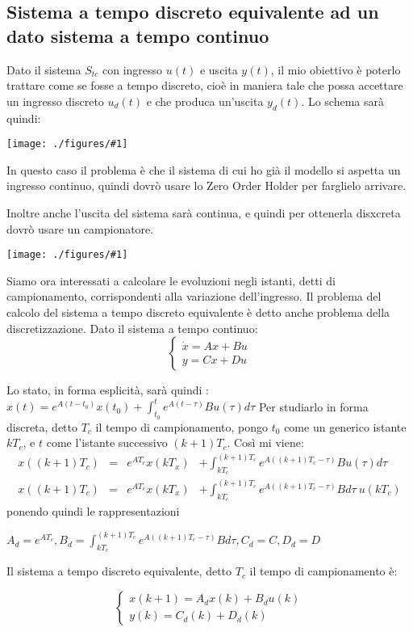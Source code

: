 \documentclass{article}
\newcommand{\incfig}[2]{%
	\texttt{[image: ./figures/\#1]}%
}
\begin{document}
\subsection{Sistema a tempo discreto equivalente ad un dato sistema a tempo continuo}
Dato il sistema $S_{tc}$ con ingresso $u(t)$ e uscita $y(t)$, il mio obiettivo è poterlo trattare come se fosse a tempo discreto, cioè in maniera tale
che possa accettare un ingresso discreto $u_d(t)$ e che produca un'uscita $y_d(t)$.
Lo schema sarà quindi:

\incfig{ZOH.jpeg}{0.4}

In questo caso il problema è che il sistema di cui ho già il modello si aspetta un ingresso continuo, quindi dovrò usare lo Zero Order Holder per
farglielo arrivare.

Inoltre anche l'uscita del sistema sarà continua, e quindi per ottenerla disxcreta dovrò usare un campionatore.

\incfig{discreto.jpeg}{0.4}

Siamo ora interessati a calcolare le evoluzioni negli istanti, detti di campionamento, corrispondenti alla variazione dell'ingresso.
Il problema del calcolo del sistema a tempo discreto equivalente è detto anche problema della discretizzazione. Dato il sistema a tempo continuo:
\[
\begin{cases}
    \dot{x} = Ax+Bu\\
    y = Cx+Du
\end{cases}
\]

Lo stato, in forma esplicità, sarà quindi : \(\displaystyle x(t) = e^{A(t-t_0)}x(t_0) + \int_{t_0}^{t} e^{A(t-\tau)}Bu(\tau)d\tau\)
Per studiarlo in forma discreta, detto $T_c$ il tempo di campionamento, pongo $t_0$ come un generico istante $kT_c$, e $t$ come l'istante successivo
$(k+1)T_c$. Così mi viene:
\begin{align*} 
    x((k+1)T_c) &=& e^{AT_c}x(kT_x) &+ \int_{kT_c}^{(k+1)T_c} e ^{A((k+1)T_c-\tau)}B u(\tau) d\tau \\
    x((k+1)T_c) &=& e^{AT_c}x(kT_x) &+ \int_{kT_c}^{(k+1)T_c} e ^{A((k+1)T_c-\tau)}B  d\tau \ u(kT_c)
\end{align*}
ponendo quindi le rappresentazioni 

\(\displaystyle A_d=e^{AT_c}, B_d=\int_{kT_c}^{(k+1)T_c} e^{A((k+1)T_c-\tau)}B d\tau , C_d = C,  D_d=D\)

Il sistema a tempo discreto equivalente, detto $T_c$ il tempo di campionamento è:

\[
\begin{cases}
    x(k+1)=A_d x(k)+B_d u(k)\\
    y(k)=C_d (k) + D_d(k)
\end{cases}
\]
\end{document}
